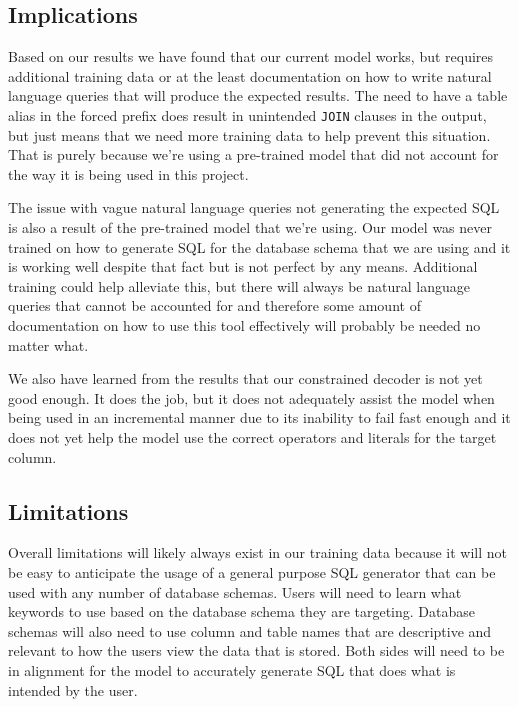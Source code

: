 \documentclass[11pt]{article}
\begin{document}
\subsection{Implications}


Based on our results we have found that our current model works, but requires additional training data or at the least documentation on how to write natural language queries that will produce the expected results. The need to have a table alias in the forced prefix does result in unintended \texttt{JOIN} clauses in the output, but just means that we need more training data to help prevent this situation. That is purely because we're using a pre-trained model that did not account for the way it is being used in this project.

The issue with vague natural language queries not generating the expected SQL is also a result of the pre-trained model that we're using. Our model was never trained on how to generate SQL for the database schema that we are using and it is working well despite that fact but is not perfect by any means. Additional training could help alleviate this, but there will always be natural language queries that cannot be accounted for and therefore some amount of documentation on how to use this tool effectively will probably be needed no matter what.

We also have learned from the results that our constrained decoder is not yet good enough. It does the job, but it does not adequately assist the model when being used in an incremental manner due to its inability to fail fast enough and it does not yet help the model use the correct operators and literals for the target column.


\subsection{Limitations}


Overall limitations will likely always exist in our training data because it will not be easy to anticipate the usage of a general purpose SQL generator that can be used with any number of database schemas. Users will need to learn what keywords to use based on the database schema they are targeting. Database schemas will also need to use column and table names that are descriptive and relevant to how the users view the data that is stored. Both sides will need to be in alignment for the model to accurately generate SQL that does what is intended by the user.
\end{document}
